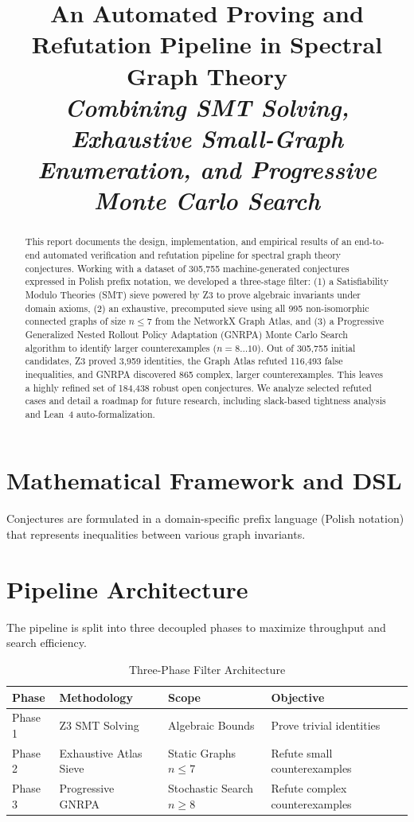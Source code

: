 \documentclass[11pt,letterpaper]{article}
\title{\textbf{An Automated Proving and Refutation Pipeline in Spectral Graph Theory}\\
\large\textit{Combining SMT Solving, Exhaustive Small-Graph Enumeration, and Progressive Monte Carlo Search}}
\begin{document}
\maketitle

\begin{abstract}
This report documents the design, implementation, and empirical results of an end-to-end automated verification and refutation pipeline for spectral graph theory conjectures. Working with a dataset of 305,755 machine-generated conjectures expressed in Polish prefix notation, we developed a three-stage filter: (1) a Satisfiability Modulo Theories (SMT) sieve powered by Z3 to prove algebraic invariants under domain axioms, (2) an exhaustive, precomputed sieve using all 995 non-isomorphic connected graphs of size $n \le 7$ from the NetworkX Graph Atlas, and (3) a Progressive Generalized Nested Rollout Policy Adaptation (GNRPA) Monte Carlo Search algorithm to identify larger counterexamples ($n = 8 \dots 10$). Out of 305,755 initial candidates, Z3 proved 3,959 identities, the Graph Atlas refuted 116,493 false inequalities, and GNRPA discovered 865 complex, larger counterexamples. This leaves a highly refined set of 184,438 robust open conjectures. We analyze selected refuted cases and detail a roadmap for future research, including slack-based tightness analysis and Lean~4 auto-formalization.
\end{abstract}


\section{Mathematical Framework and DSL}
Conjectures are formulated in a domain-specific prefix language (Polish notation) that represents inequalities between various graph invariants. 

\section{Pipeline Architecture}
The pipeline is split into three decoupled phases to maximize throughput and search efficiency.

\begin{table}[h]
\centering
\caption{Three-Phase Filter Architecture}
\label{tab:pipeline}
\begin{tabular}{llll}
\toprule
\textbf{Phase} & \textbf{Methodology} & \textbf{Scope} & \textbf{Objective} \\
\midrule
Phase 1 & Z3 SMT Solving & Algebraic Bounds & Prove trivial identities \\
Phase 2 & Exhaustive Atlas Sieve & Static Graphs $n \le 7$ & Refute small counterexamples \\
Phase 3 & Progressive GNRPA & Stochastic Search $n \ge 8$ & Refute complex counterexamples \\
\bottomrule
\end{tabular}
\end{table}
\end{document}
